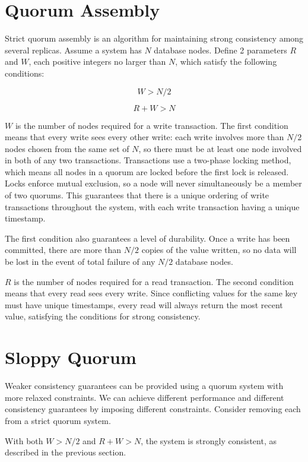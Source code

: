 \documentclass[12pt,a4paper,twoside,openany]{report}
\begin{document}
\section{Quorum Assembly}

Strict quorum assembly is an algorithm for maintaining strong consistency among several replicas. Assume a system has $N$ database nodes. Define 2 parameters $R$ and $W$, each positive integers no larger than $N$, which satisfy the following conditions:

$$W > N / 2$$

$$R + W > N$$


$W$ is the number of nodes required for a write transaction. The first condition means that every write sees every other write: each write involves more than $N/2$ nodes chosen from the same set of $N$, so there must be at least one node involved in both of any two transactions. Transactions use a two-phase locking method, which means all nodes in a quorum are locked before the first lock is released. Locks enforce mutual exclusion, so a node will never simultaneously be a member of two quorums. This guarantees that there is a unique ordering of write transactions throughout the system, with each write transaction having a unique timestamp.

The first condition also guarantees a level of durability. Once a write has been committed, there are more than $N/2$ copies of the value written, so no data will be lost in the event of total failure of any $N/2$ database nodes.

$R$ is the number of nodes required for a read transaction. The second condition means that every read sees every write. Since conflicting values for the same key must have unique timestamps, every read will always return the most recent value, satisfying the conditions for strong consistency.

\section{Sloppy Quorum}

Weaker consistency guarantees can be provided using a quorum system with more relaxed constraints. We can achieve different performance and different consistency guarantees by imposing different constraints. Consider removing each from a strict quorum system.

With both $W > N/2$ and $R + W > N$, the system is strongly consistent, as described in the previous section.
\end{document}
